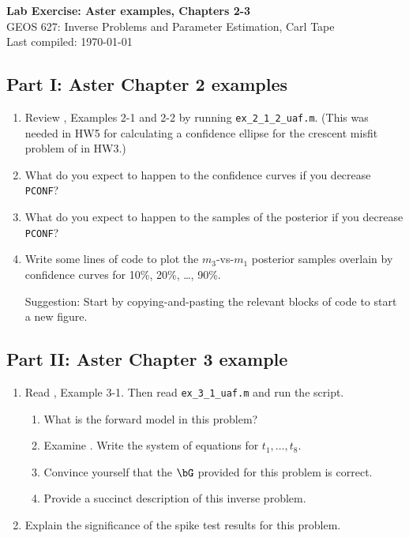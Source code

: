 \documentclass[11pt,titlepage,fleqn]{article}
\begin{document}

\begin{spacing}{1.2}
\centering
{\large \bf Lab Exercise: Aster examples, Chapters 2-3} \\
GEOS 627: Inverse Problems and Parameter Estimation, Carl Tape \\
Last compiled: \today \\
\end{spacing}

\subsection*{Part I: Aster Chapter 2 examples}

\begin{enumerate}
\item Review \citet{AsterE2}, Examples 2-1 and 2-2 by running \verb+ex_2_1_2_uaf.m+.
(This was needed in HW5 for calculating a confidence ellipse for the crescent misfit problem of \citet{Tarantola2005} in HW3.)

\item What do you expect to happen to the confidence curves if you decrease \verb+PCONF+?

\item What do you expect to happen to the samples of the posterior if you decrease \verb+PCONF+?

\item Write some lines of code to plot the $m_3$-vs-$m_1$ posterior samples overlain by confidence curves for 10\%, 20\%, \ldots, 90\%.

Suggestion: Start by copying-and-pasting the relevant blocks of code to start a new figure.

\end{enumerate}


\subsection*{Part II: Aster Chapter 3 example}

\begin{enumerate}
\item Read \citet{AsterE2}, Example 3-1. Then read \verb+ex_3_1_uaf.m+ and run the script. 
%
\begin{enumerate}
\item What is the forward model in this problem?
\item Examine . Write the system of equations for $t_1, \ldots, t_8$.
\item Convince yourself that the $\bG$ provided for this problem is correct.
\item Provide a succinct description of this inverse problem.
\end{enumerate}

\item Explain the significance of the spike test results for this problem.

\end{enumerate}
\end{document}
